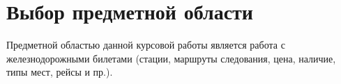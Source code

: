 \section{Выбор предметной области}

Предметной областью данной курсовой работы является работа с железнодорожными билетами (стации, маршруты следования, цена, наличие, типы мест, рейсы и пр.). \par 

\clearpage